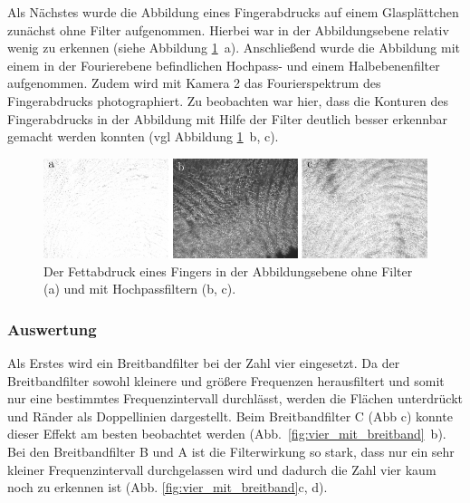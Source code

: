 Als Nächstes wurde die Abbildung eines Fingerabdrucks auf einem Glasplättchen zunächst ohne Filter aufgenommen. Hierbei war in der Abbildungsebene relativ wenig zu erkennen (siehe Abbildung \ref{fig:example20_Hochpass}~a). Anschließend wurde die Abbildung mit einem in der Fourierebene befindlichen Hochpass- und einem Halbebenenfilter aufgenommen. Zudem wird mit Kamera 2 das Fourierspektrum des Fingerabdrucks photographiert. Zu beobachten war hier, dass die Konturen des Fingerabdrucks in der Abbildung mit Hilfe der Filter deutlich besser erkennbar gemacht werden konnten (vgl Abbildung \ref{fig:example20_Hochpass}~b, c).\\


\begin{figure}[h]
	\centering
	\includegraphics{images/ergebniss_Fingerab/abb.pdf}
	\caption{
		Der Fettabdruck eines Fingers in der Abbildungsebene ohne Filter (a) und mit Hochpassfiltern (b, c).
	}
	\label{fig:example20_Hochpass}
\end{figure}

\subsubsection*{Auswertung}

Als Erstes wird ein Breitbandfilter bei der Zahl vier eingesetzt. Da der Breitbandfilter sowohl kleinere und größere Frequenzen herausfiltert und somit nur eine bestimmtes Frequenzintervall durchlässt, werden die Flächen unterdrückt und Ränder als Doppellinien dargestellt. Beim Breitbandfilter C (Abb %
c) konnte dieser Effekt am besten beobachtet werden (Abb.~\ref{fig:vier_mit_breitband}~b). Bei den Breitbandfilter B und A ist die Filterwirkung so stark, dass nur
ein sehr kleiner Frequenzintervall durchgelassen wird und dadurch die Zahl vier kaum noch zu erkennen ist (Abb. \ref{fig:vier_mit_breitband}c, d).

